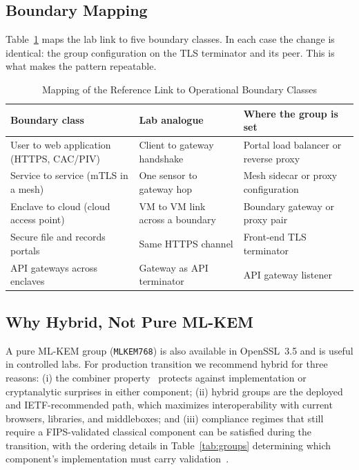 \documentclass[conference]{IEEEtran}
\begin{document}
\subsection{Boundary Mapping}
Table~\ref{tab:mapping} maps the lab link to five boundary classes. In each case the change is identical: the group configuration on the TLS terminator and its peer. This is what makes the pattern repeatable.

\begin{table}[t]
\centering
\caption{Mapping of the Reference Link to Operational Boundary Classes}
\label{tab:mapping}
\footnotesize
\begin{tabular}{@{}>{\raggedright\arraybackslash}p{}>{\raggedright\arraybackslash}p{}>{\raggedright\arraybackslash}p{}@{}}
\toprule
Boundary class & Lab analogue & Where the group is set \\
\midrule
User to web application (HTTPS, CAC/PIV) & Client to gateway handshake & Portal load balancer or reverse proxy \\
Service to service (mTLS in a mesh) & One sensor to gateway hop & Mesh sidecar or proxy configuration \\
Enclave to cloud (cloud access point) & VM to VM link across a boundary & Boundary gateway or proxy pair \\
Secure file and records portals & Same HTTPS channel & Front-end TLS terminator \\
API gateways across enclaves & Gateway as API terminator & API gateway listener \\
\bottomrule
\end{tabular}
\end{table}

\subsection{Why Hybrid, Not Pure ML-KEM}
A pure ML-KEM group (\texttt{MLKEM768}) is also available in OpenSSL~3.5 and is useful in controlled labs. For production transition we recommend hybrid for three reasons: (i) the combiner property~\cite{bindel2019} protects against implementation or cryptanalytic surprises in either component; (ii) hybrid groups are the deployed and IETF-recommended path, which maximizes interoperability with current browsers, libraries, and middleboxes; and (iii) compliance regimes that still require a FIPS-validated classical component can be satisfied during the transition, with the ordering details in Table~\ref{tab:groups} determining which component's implementation must carry validation~\cite{rfc10024}.
\end{document}
